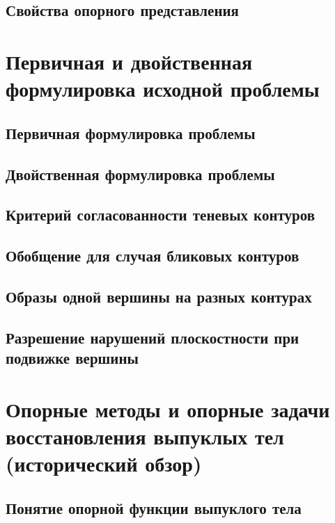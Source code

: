 \documentclass[a4paper, 12pt, titlepage]{article}
\theoremstyle{definition}
\theoremstyle{plain}
\theoremstyle{plain}
\begin{document}
\subsection{Свойства опорного представления}


\section{Первичная и двойственная формулировка исходной проблемы}

\subsection{Первичная формулировка проблемы}

\subsection{Двойственная формулировка проблемы}

\subsection{Критерий согласованности теневых контуров}

\subsection{Обобщение для случая бликовых контуров}

\subsection{Образы одной вершины на разных контурах}

\subsection{Разрешение нарушений плоскостности при подвижке вершины}


\section{Опорные методы и опорные задачи восстановления выпуклых
тел (исторический обзор)}

\subsection{Понятие опорной функции выпуклого тела}
\end{document}
